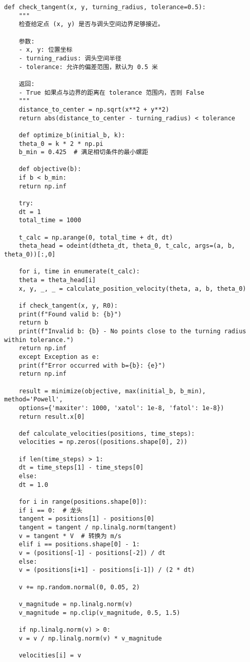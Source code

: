 \begin{lstlisting}[caption={问题四处理代码}]
	def check_tangent(x, y, turning_radius, tolerance=0.5):
	"""
	检查给定点 (x, y) 是否与调头空间边界足够接近。
	
	参数:
	- x, y: 位置坐标
	- turning_radius: 调头空间半径
	- tolerance: 允许的偏差范围，默认为 0.5 米
	
	返回:
	- True 如果点与边界的距离在 tolerance 范围内，否则 False
	"""
	distance_to_center = np.sqrt(x**2 + y**2)
	return abs(distance_to_center - turning_radius) < tolerance
	
	def optimize_b(initial_b, k):
	theta_0 = k * 2 * np.pi
	b_min = 0.425  # 满足相切条件的最小螺距
	
	def objective(b):
	if b < b_min:
	return np.inf
	
	try:
	dt = 1
	total_time = 1000
	
	t_calc = np.arange(0, total_time + dt, dt)
	theta_head = odeint(dtheta_dt, theta_0, t_calc, args=(a, b, theta_0))[:,0]
	
	for i, time in enumerate(t_calc):
	theta = theta_head[i]
	x, y, _, _ = calculate_position_velocity(theta, a, b, theta_0)
	
	if check_tangent(x, y, R0):
	print(f"Found valid b: {b}")
	return b
	print(f"Invalid b: {b} - No points close to the turning radius within tolerance.")
	return np.inf
	except Exception as e:
	print(f"Error occurred with b={b}: {e}")
	return np.inf
	
	result = minimize(objective, max(initial_b, b_min), method='Powell', 
	options={'maxiter': 1000, 'xatol': 1e-8, 'fatol': 1e-8})
	return result.x[0]
	
	def calculate_velocities(positions, time_steps):
	velocities = np.zeros((positions.shape[0], 2))
	
	if len(time_steps) > 1:
	dt = time_steps[1] - time_steps[0]
	else:
	dt = 1.0
	
	for i in range(positions.shape[0]):
	if i == 0:  # 龙头
	tangent = positions[1] - positions[0]
	tangent = tangent / np.linalg.norm(tangent)
	v = tangent * V  # 转换为 m/s
	elif i == positions.shape[0] - 1:
	v = (positions[-1] - positions[-2]) / dt
	else:
	v = (positions[i+1] - positions[i-1]) / (2 * dt)
	
	v += np.random.normal(0, 0.05, 2)
	
	v_magnitude = np.linalg.norm(v)
	v_magnitude = np.clip(v_magnitude, 0.5, 1.5)
	
	if np.linalg.norm(v) > 0:
	v = v / np.linalg.norm(v) * v_magnitude
	
	velocities[i] = v
	

\end{lstlisting}
